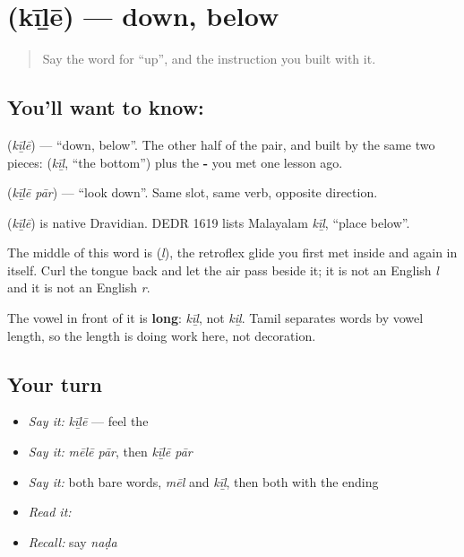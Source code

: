 \section[\texorpdfstring{\ta{கீழே} (kīḻē)}{கீழே (kīḻē)}]{ (kīḻē) — down, below}

\label{lesson:TA-C66-down}



\begin{quote}
Say the word for \textquotedblleft{}up\textquotedblright{}, and the instruction you built with it.
\end{quote}

\subsection*{You'll want to know: }
\textbf{} (\emph{kīḻē}) — \textquotedblleft{}down, below\textquotedblright{}. The other half of the pair, and built by the same two pieces: \textbf{} (\emph{kīḻ}, \textquotedblleft{}the bottom\textquotedblright{}) plus the \textbf{-} you met one lesson ago.

\textbf{ } (\emph{kīḻē pār}) — \textquotedblleft{}look down\textquotedblright{}. Same slot, same verb, opposite direction.

\begin{cousinweb}
\textbf{} (\emph{kīḻē}) is native Dravidian. DEDR 1619 lists Malayalam \emph{kīḻ}, \textquotedblleft{}place below\textquotedblright{}.
\end{cousinweb}

\begin{sounds}
The middle of this word is \textbf{} (\emph{ḻ}), the retroflex glide you first met inside \textbf{} and again in \textbf{} itself. Curl the tongue back and let the air pass beside it; it is not an English \emph{l} and it is not an English \emph{r}.

The vowel in front of it is \textbf{long}: \emph{kīḻ}, not \emph{kiḻ}. Tamil separates words by vowel length, so the length is doing work here, not decoration.
\end{sounds}

\subsection*{Your turn}
\begin{itemize}
\raggedright
  \item \emph{Say it:} \emph{kīḻē} — feel the 
  \item \emph{Say it:} \emph{mēlē pār}, then \emph{kīḻē pār}
  \item \emph{Say it:} both bare words, \emph{mēl} and \emph{kīḻ}, then both with the ending
  \item \emph{Read it:} \textbf{}
  \item \emph{Recall:} say \emph{naḍa}
\end{itemize}


